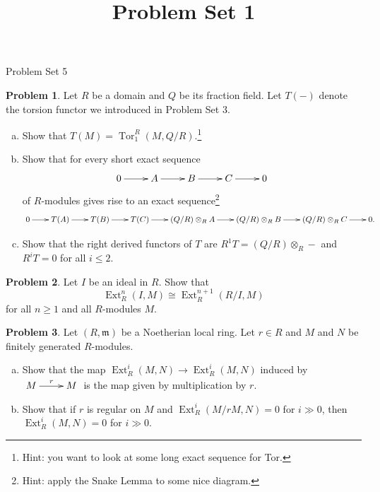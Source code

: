 \documentclass[11pt]{article}
\title{}
\date{\vspace{-0.5in}}
\title{Problem Set 1}
\DeclareMathOperator{\Tor}{Tor}
\DeclareMathOperator{\Ext}{Ext}
\newcommand{\m}{\mathfrak{m}}
\theoremstyle{definition}
\newtheorem{problem}{Problem}
\begin{document}
\thispagestyle{fancy}
\pagestyle{fancy}


\begin{center}
	{\LARGE Problem Set 5}
\end{center}


\begin{problem}
	Let $R$ be a domain and $Q$ be its fraction field. Let $T(-)$ denote the torsion functor we introduced in Problem Set 3. 
	\begin{enumerate}[a)]
		\item Show that $T(M) = \Tor_1^R(M,Q/R)$.\footnote{Hint: you want to look at some long exact sequence for Tor.}
		\item Show that for every short exact sequence
	$$\xymatrix{0 \ar[r] & A \ar[r] & B \ar[r] & C \ar[r] & 0}$$
	of $R$-modules gives rise to an exact sequence\footnote{Hint: apply the Snake Lemma to some nice diagram.}
	$$\xymatrix@C=7mm{0 \ar[r] & T(A) \ar[r] & T(B) \ar[r] & T(C) \ar[r] & (Q/R) \otimes_R A \ar[r] & (Q/R) \otimes_R B \ar[r] & (Q/R) \otimes_R C \ar[r] & 0.}$$
	\item Show that the right derived functors of $T$ are $R^1T = (Q/R) \otimes_R -$ and $R^iT = 0$ for all $i \leqslant 2$.	
	\end{enumerate}
	\end{problem}
	
	\vfill


\begin{problem}
	Let $I$ be an ideal in $R$. Show that
	$$\Ext^{n}_R(I,M) \cong \Ext^{n+1}_R(R/I,M)$$
	for all $n \geqslant 1$ and all $R$-modules $M$.
\end{problem}

\vfill

\begin{problem}
	Let $(R,\m)$ be a Noetherian local ring. Let $r \in R$ and $M$ and $N$ be finitely generated $R$-modules.
	\begin{enumerate}[a)]
		\item Show that the map $\Ext^i_R(M,N) \to \Ext^i_R(M,N)$ induced by $\xymatrix{M \ar[r]^-r & M}$ is the map given by multiplication by $r$.
		\item Show that if $r$ is regular on $M$ and $\Ext^i_R(M/rM,N) = 0$ for $i \gg 0$, then $\Ext^i_R(M,N) = 0$ for $i \gg 0$.
	\end{enumerate}
\end{problem}

\vfill
\end{document}
